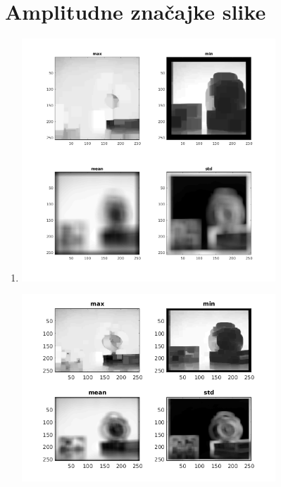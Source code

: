\documentclass[12pt, a4]{report}
\begin{document}
\section{Amplitudne značajke slike}
\begin{enumerate}
	\item
	      \begin{minipage}{\linewidth}
		      \centering
		      \includegraphics[width=0.75\textwidth]{ampfeat}
	      \end{minipage}
	      \begin{minipage}{\linewidth}
		      \centering
		      \includegraphics[width=0.75\textwidth]{ampfeat16}
	      \end{minipage}
	      \begin{minipage}{\linewidth}

\end{minipage}
\end{enumerate}
\end{document}
